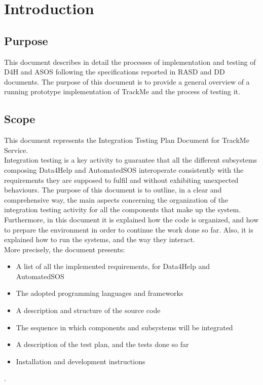 \documentclass[a4paper, hidelinks, 12pt]{report}
\begin{document}
	\tableofcontents
	\newpage
	\listoftables
	\clearpage
	\setcounter{page}{1}

	\chapter{Introduction}
	\section{Purpose}
	This document describes in detail the processes of implementation and testing of D4H and ASOS following the specifications reported in RASD and DD documents. The purpose of this document is to provide a general overview of a running prototype implementation of TrackMe and the process of testing it.

	\section{Scope}
	This document represents the Integration Testing Plan Document for TrackMe Service. \\

	Integration testing is a key activity to guarantee that all the different subsystems composing Data4Help and AutomatedSOS interoperate consistently with the requirements they are supposed to fulfil and without exhibiting unexpected behaviours. The purpose of this document is to outline, in a clear and comprehensive way, the main aspects concerning the organization of the integration testing activity for all the components that make up the system.\\

	Furthermore, in this document it is explained how the code is organized, and how to prepare the environment in order to continue the work done so far. Also, it is explained how to run the systems, and the way they interact.\\

	More precisely, the document presents:

\begin{itemize}
		\item{A list of all the implemented requirements, for Data4Help and AutomatedSOS}
		\item{The adopted programming languages and frameworks}
		\item{A description and structure of the source code}
		\item{The sequence in which components and subsystems will be integrated}
		\item{A description of the test plan, and the tests done so far}
		\item{Installation and development instructions}
	\end{itemize}.
\end{document}
